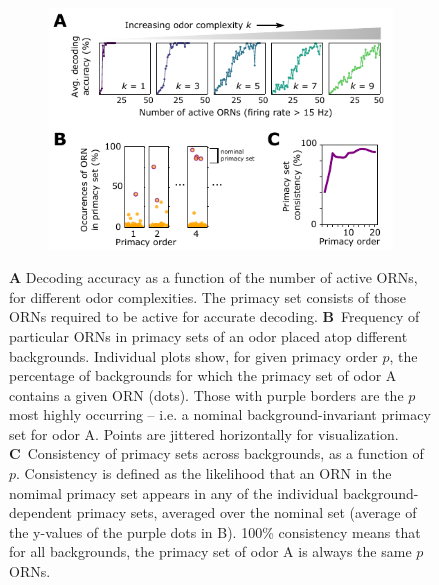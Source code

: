 \documentclass[10pt,prl,aps,showpacs,twocolumn,unsortedaddress]{revtex4-1}
\begin{document}
\begin{figure}[tb]
	\begin{subfigure}[t]{\linewidth}
		\includegraphics[width=\textwidth]{figures/4_primacy_coding}
		\label{fig:primacy_coding_a}	
	\end{subfigure}
	\begin{subfigure}[t]{0\linewidth}
		\label{fig:primacy_coding_b}
	\end{subfigure}
	\begin{subfigure}[t]{0\linewidth}
		\label{fig:primacy_coding_c}
	\end{subfigure}
	\caption{\footnotesize{
	\textbf{A} Decoding accuracy as a function of the number of active ORNs, for different odor complexities. The primacy set consists of those ORNs required to be active for accurate decoding. %
	\textbf{B}~Frequency of particular ORNs in primacy sets of an odor placed atop different backgrounds. Individual plots show, for given primacy order $p$, the percentage of backgrounds for which the primacy set of odor A contains a given ORN (dots). Those with purple borders are the $p$ most highly occurring -- i.e. a nominal background-invariant primacy set for odor A. Points are jittered horizontally for visualization.
	\textbf{C}~Consistency of primacy sets across backgrounds, as a function of $p$. Consistency is defined as the likelihood that an ORN in the nomimal primacy set appears in any of the individual background-dependent primacy sets, averaged over the nominal set (average of the y-values of the purple dots in B). 100\% consistency means that for all backgrounds, the primacy set of odor A is always the same $p$ ORNs.
	}}
	\label{fig:primacy_coding}
\end{figure}
\end{document}
